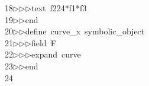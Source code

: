\begin{tabbing}
18\>$\triangleright$\>$\triangleright$\>$\triangleright$\>text\ f224*f1*f3\ \\[0pt]
19\>$\triangleright$\>$\triangleright$\>end\ \\[0pt]
20\>$\triangleright$\>$\triangleright$\>define\ curve\_x\ symbolic\_object\ \\[0pt]
21\>$\triangleright$\>$\triangleright$\>$\triangleright$\>field\ F\ \\[0pt]
22\>$\triangleright$\>$\triangleright$\>$\triangleright$\>expand\ curve\ \\[0pt]
23\>$\triangleright$\>$\triangleright$\>end\\[0pt]
24\>\end{tabbing}
